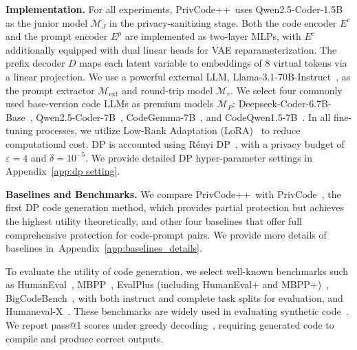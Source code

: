 \documentclass{article}
\theoremstyle{plain}
\theoremstyle{definition}
\theoremstyle{remark}
\def \toolname{PrivCode++}
\begin{document}
\noindent\textbf{Implementation.}
For all experiments, \toolname \            uses Qwen2.5-Coder-1.5B~\cite{Qwen2.5_Coder} as the junior model $\mathcal{M}_J$ in the privacy-sanitizing stage. Both the code encoder $E^c$ and the prompt encoder $E^p$ are implemented as two-layer MLPs, with $E^c$ additionally equipped with dual linear heads for VAE reparameterization. The prefix decoder $D$ maps each latent variable to embeddings of 8 virtual tokens via a linear projection. We use a powerful external LLM, Llama-3.1-70B-Instruct~\cite{grattafiori2024llama3herdmodels}, as the prompt extractor $\mathcal{M}_{\text{ext}}$ and round-trip model $\mathcal{M}_r$. We select four commonly used base-version code LLMs as premium models $\mathcal{M}_P$: Deepseek-Coder-6.7B-Base~\cite{guo2024deepseekcoderlargelanguagemodel}, Qwen2.5-Coder-7B~\cite{Qwen2.5_Coder}, CodeGemma-7B~\cite{codegemmateam2024codegemmaopencodemodels}, and CodeQwen1.5-7B~\cite{codeqwen1.5}. In all fine-tuning processes, we utilize Low-Rank Adaptation (LoRA)~\cite{hu2022lora} to reduce computational cost. DP is accounted using Rényi DP~\cite{DBLP:conf/csfw/Mironov17}, with a privacy budget of $\varepsilon=4$ and $\delta=10^{-5}$. We provide detailed DP hyper-parameter settings in Appendix~\ref{app:dp setting}.



\noindent\textbf{Baselines and Benchmarks.} We compare \toolname\ with PrivCode~\cite{liu2025privcode}, the first DP code generation method, which provides partial protection but achieves the highest utility theoretically, and other four baselines that offer full comprehensive protection for code-prompt pairs. We provide more details of baselines in~Appendix~\ref{app:baselines_details}.











To evaluate the utility of code generation, we select well-known benchmarks such as HumanEval~\cite{chen2021evaluating}, MBPP~\cite{austin2021programsynthesislargelanguage}, EvalPlus (including HumanEval+ and MBPP+)~\cite{liu2023your}, BigCodeBench~\cite{zhuo2024bigcodebenchbenchmarkingcodegeneration}, with both instruct and complete task splits for evaluation, and Humaneval-X~\cite{zheng2023codegeex}. These benchmarks are widely used in evaluating synthetic code~\cite{santacoder, magicoder, starcoder, claude4}. 
We report pass@1 scores under greedy decoding~\cite{chen2021evaluating}, requiring generated code to compile and produce correct outputs.
\end{document}
